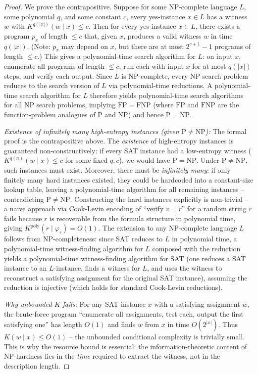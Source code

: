 \documentclass[aps,prd,twocolumn,superscriptaddress,nofootinbib]{revtex4-2}
\theoremstyle{definition}
\theoremstyle{remark}
\DeclareMathOperator{\poly}{poly}
\newcommand{\NP}{\mathrm{NP}}
\newcommand{\PP}{\mathrm{P}}
\begin{document}
\begin{proof}
We prove the contrapositive. Suppose for some NP-complete language $L$, some polynomial $q$, and some constant $c$, every yes-instance $x \in L$ has a witness $w$ with $K^{q(|x|)}(w \mid x) \leq c$. Then for every yes-instance $x \in L$, there exists a program $p_x$ of length $\leq c$ that, given $x$, produces a valid witness $w$ in time $q(|x|)$. (Note: $p_x$ may depend on $x$, but there are at most $2^{c+1} - 1$ programs of length $\leq c$.) This gives a polynomial-time search algorithm for $L$: on input $x$, enumerate all programs of length $\leq c$, run each with input $x$ for at most $q(|x|)$ steps, and verify each output. Since $L$ is NP-complete, every NP search problem reduces to the search version of $L$ via polynomial-time reductions. A polynomial-time search algorithm for $L$ therefore yields polynomial-time search algorithms for all NP search problems, implying $\mathrm{FP} = \mathrm{FNP}$ (where $\mathrm{FP}$ and $\mathrm{FNP}$ are the function-problem analogues of $\PP$ and $\NP$) and hence $\PP = \NP$.

\textit{Existence of infinitely many high-entropy instances (given $\PP \neq \NP$):} The formal proof is the contrapositive above. The \textit{existence} of high-entropy instances is guaranteed non-constructively: if every SAT instance had a low-entropy witness ($K^{q(n)}(w \mid x) \leq c$ for some fixed $q, c$), we would have $\PP = \NP$. Under $\PP \neq \NP$, such instances must exist. Moreover, there must be \textit{infinitely many}: if only finitely many hard instances existed, they could be hardcoded into a constant-size lookup table, leaving a polynomial-time algorithm for all remaining instances -- contradicting $\PP \neq \NP$. Constructing the hard instances explicitly is non-trivial -- a naive approach via Cook-Levin encoding of ``verify $v = r$'' for a random string $r$ fails because $r$ is recoverable from the formula structure in polynomial time, giving $K^{\poly}(r \mid \varphi_r) = O(1)$. The extension to any NP-complete language $L$ follows from NP-completeness: since SAT reduces to $L$ in polynomial time, a polynomial-time witness-finding algorithm for $L$ composed with the reduction yields a polynomial-time witness-finding algorithm for SAT (one reduces a SAT instance to an $L$-instance, finds a witness for $L$, and uses the witness to reconstruct a satisfying assignment for the original SAT instance), assuming the reduction is injective (which holds for standard Cook-Levin reductions).

\textit{Why unbounded $K$ fails:} For any SAT instance $x$ with a satisfying assignment $w$, the brute-force program ``enumerate all assignments, test each, output the first satisfying one'' has length $O(1)$ and finds $w$ from $x$ in time $O(2^{|x|})$. Thus $K(w \mid x) \leq O(1)$ -- the unbounded conditional complexity is trivially small. This is why the resource bound is essential: the information-theoretic content of NP-hardness lies in the \textit{time} required to extract the witness, not in the description length.
\end{proof}
\end{document}

